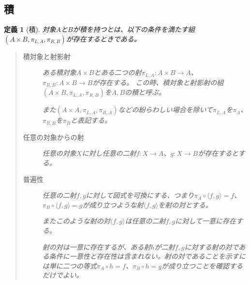 \documentclass[dvipdfmx]{jsarticle}
\newcommand{\arrow}{\rightarrow}
\newcommand{\tuple}[1]{\langle #1\rangle}
\newcommand{\mor}[3]{#1:#2\arrow #3}
\newtheorem{define}{定義}[section]
\numberwithin{proof}{subsection}
\numberwithin{prop}{subsection}
\numberwithin{define}{subsection}
\begin{document}
	\subsection{積}
	\begin{define}[積]
		対象$A$と$B$が積を持つとは、以下の条件を満たす組$(A\times B,\pi_{L,A},\pi_{R,B})$が存在するときである。
		\begin{quote}
			\begin{description}
			\item[積対象と射影射]ある積対象$A\times B$とある二つの射$\mor{\pi_{L,A}}{A\times B}{A}$、$\mor{\pi_{R,B}}{A\times B}{B}$が存在する。
			この時、積対象と射影射の組$(A\times B,\pi_{L,A},\pi_{R,B})$を$A,B$の積と呼ぶ。


			\begin{center}
			\end{center}
			また$(A\times A,\pi_{L,A},\pi_{R,A})$などの紛らわしい場合を除いて$\pi_{L,A}$を$\pi_A$、$\pi_{R,B}$を$\pi_B$と表記する。
			\item[任意の対象からの射]任意の対象$X$に対し任意の二射$\mor{f}{X}{A}$、$\mor{g}{X}{B}$が存在するとする。
			\begin{center}
			\end{center}
			\item[普遍性]任意の二射$f,g$に対して図式を可換にする、つまり$\pi_A\circ\tuple{f,g}=f$、$\pi_B\circ\tuple{f,g}=g$が成り立つような射$\tuple{f,g}$を射の対とする。

			またこのような射の対$\tuple{f,g}$は任意の二射$f,g$に対して一意に存在する。

			射の対は一意に存在するが、ある射$h$が二射$f,g$に対する射の対である条件に一意性と存在性は含まれない。射の対であることを示すには単に二つの等式$\pi_A\circ h=f$、$\pi_B\circ h=g$が成り立つことを確認するだけでよい。


\end{description}
\end{quote}
\end{define}
\end{document}
